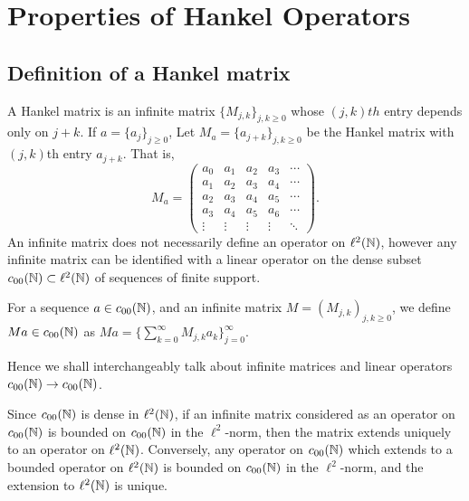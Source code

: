
\chapter{Properties of Hankel Operators} %

\label{PropertiesOfHankelOperators} %




\section{Definition of a Hankel matrix}
A Hankel matrix is an infinite matrix $\{M_{j,k}\}_{j,k \geq 0}$
whose $(j,k)th$ entry depends only on $j+k$. If $a = \{a_j\}_{j\geq 0}$,
Let $M_a = \{a_{j+k}\}_{j,k\geq 0}$ be the Hankel matrix with $(j,k)$th
entry $a_{j+k}$. That is,
\begin{equation*}
    M_a = \begin{pmatrix}
        a_0 & a_1 & a_2 & a_3 & \cdots\\
        a_1 & a_2 & a_3 & a_4 & \cdots\\
        a_2 & a_3 & a_4 & a_5 & \cdots\\
        a_3 & a_4 & a_5 & a_6 & \cdots\\
        \vdots & \vdots & \vdots & \vdots & \ddots
    \end{pmatrix}.
\end{equation*}
An infinite matrix does not necessarily define an operator on $\ell^2(\mathbb{N})$, 
however any infinite matrix can be identified with a linear operator 
on the dense subset $c_{00}(\mathbb{N}) \subset \ell^2(\mathbb{N})$ of sequences
of finite support. 

For a sequence $a \in c_{00}(\mathbb{N})$, and an infinite matrix $M = (M_{j,k})_{j,k\geq 0}$, 
we define $Ma \in c_{00}(\mathbb{N})$ as $Ma = \{\sum_{k=0}^\infty M_{j,k}a_k\}_{j=0}^\infty$.

Hence we shall interchangeably talk about infinite matrices and linear
operators $c_{00}(\mathbb{N})\rightarrow c_{00}(\mathbb{N})$.

Since $c_{00}(\mathbb{N})$ is dense in $\ell^2(\mathbb{N})$, if an infinite matrix
considered as an operator on $c_{00}(\mathbb{N})$ is bounded on $c_{00}(\mathbb{N})$
in the $\ell^2$-norm, then the matrix extends uniquely to an operator on $\ell^2(\mathbb{N})$.
Conversely, any operator on $c_{00}(\mathbb{N})$ which extends to a bounded
operator on $\ell^2(\mathbb{N})$ is bounded on $c_{00}(\mathbb{N})$ in the $\ell^2$-norm,
and the extension to $\ell^2(\mathbb{N})$ is unique.

